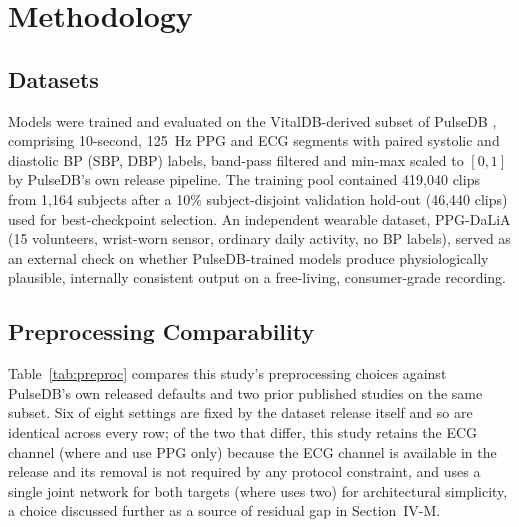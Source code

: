 \documentclass[journal]{IEEEtran}
\begin{document}
\section{Methodology}

\subsection{Datasets}
Models were trained and evaluated on the VitalDB-derived subset of PulseDB \cite{wang2022}, comprising 10-second, 125~Hz PPG and ECG segments with paired systolic and diastolic BP (SBP, DBP) labels, band-pass filtered and min-max scaled to $[0,1]$ by PulseDB's own release pipeline. The training pool contained 419{,}040 clips from 1{,}164 subjects after a 10\% subject-disjoint validation hold-out (46{,}440 clips) used for best-checkpoint selection. An independent wearable dataset, PPG-DaLiA \cite{reiss2019} (15 volunteers, wrist-worn sensor, ordinary daily activity, no BP labels), served as an external check on whether PulseDB-trained models produce physiologically plausible, internally consistent output on a free-living, consumer-grade recording.

\subsection{Preprocessing Comparability}
Table~\ref{tab:preproc} compares this study's preprocessing choices against PulseDB's own released defaults and two prior published studies on the same subset. Six of eight settings are fixed by the dataset release itself and so are identical across every row; of the two that differ, this study retains the ECG channel (where \cite{huang2024} and \cite{shen2026} use PPG only) because the ECG channel is available in the release and its removal is not required by any protocol constraint, and uses a single joint network for both targets (where \cite{shen2026} uses two) for architectural simplicity, a choice discussed further as a source of residual gap in Section~IV-M.
\end{document}
